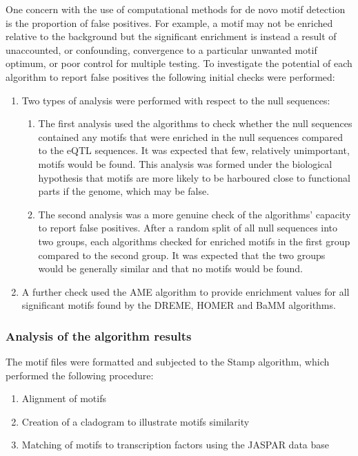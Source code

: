 \documentclass[12pt]{article}
\begin{document}
One concern with the use of computational methods for de novo motif detection is the proportion of false positives. For example, a motif may not be enriched relative to the background but the significant enrichment is instead a result of unaccounted, or confounding, convergence to a particular unwanted motif optimum, or poor control for multiple testing. To investigate the potential of each algorithm to report false positives the following initial checks were performed:
\begin{enumerate}
\item Two types of analysis were performed with respect to the null sequences:
\begin{enumerate}
\item The first analysis used the algorithms to check whether the null sequences contained any motifs that were enriched in the null sequences compared to the eQTL sequences. It was expected that few, relatively unimportant, motifs would be found. This analysis was formed under the biological hypothesis that motifs are more likely to be harboured close to functional parts if the genome, which may be false.
\item The second analysis was a more genuine check of the algorithms' capacity to report false positives. After a random split of all null sequences into two groups, each algorithms checked for enriched motifs in the first group compared to the second group. It was expected that the two groups would be generally similar and that no motifs would be found. 
\end{enumerate}
\item A further check used the AME algorithm \citep{Buske2010} to provide enrichment values for all significant motifs found by the DREME, HOMER and BaMM algorithms. 
\end{enumerate}

\subsubsection{Analysis of the algorithm results}

The motif files were formatted and subjected to the Stamp algorithm, which performed the following procedure:
\begin{enumerate}
\item Alignment of motifs
\item Creation of a cladogram to illustrate motifs similarity
\item Matching of motifs to transcription factors using the JASPAR data base \citep{Mathelier2016}
\end{enumerate}
\end{document}
